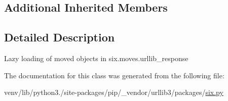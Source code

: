 \subsection*{Additional Inherited Members}


\subsection{Detailed Description}
\begin{DoxyVerb}Lazy loading of moved objects in six.moves.urllib_response\end{DoxyVerb}
 

The documentation for this class was generated from the following file\+:\begin{DoxyCompactItemize}
\item 
venv/lib/python3./site-\/packages/pip/\+\_\+vendor/urllib3/packages/\hyperlink{pip_2__vendor_2urllib3_2packages_2six_8py}{six.\+py}\end{DoxyCompactItemize}
